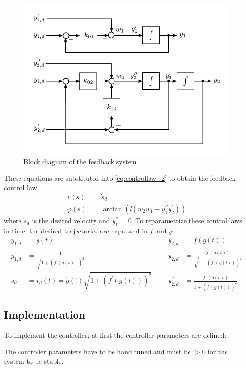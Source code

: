 \documentclass[a4paper,11pt,headings=standardclasses,parskip=half]{scrartcl}
\newcommand{\listcode}[3]{}
\newcommand{\listcodefbcontrol}[2]{\listcode{#1}{#2}{../sim/03_car_feedback_control.py}}
\begin{document}
\begin{figure}[ht]
\centering
\includegraphics[scale=1]{img/linear_system_feedback.pdf}
\caption{Block diagram of the feedback system}
\label{fig:linear_system_feedback}
\end{figure}
These equations are substituted into \eqref{eq:controllaw_2} to obtain the feedback control law:
\begin{subequations}
\begin{align}
v(s) &= \dot{s}_d\\
\varphi(s) &= \arctan\left(l (w_2w_1-y_1^{\prime\prime}y_2^\prime)\right)
\end{align}
\end{subequations}
where $\dot{s}_d$ is the desired velocity  and $y_1^{\prime\prime} = 0$.
To reparametrize these control laws in time, the desired trajectories are expressed in $f$ and $g$:
\begin{subequations}
\begin{align*}
y_{1,d} &= g(t)  &&& y_{2,d} &= f(g(t))\\
y_{1,d}^\prime &= \frac{1}{\sqrt{1+(f^{\prime }(g(t)))^2}} &&& y_{2,d}^\prime &= \frac{f^{\prime }(g(t))}{\sqrt{1+(f^{\prime }(g(t)))^2}}\\
\dot{s}_d &= v_d(t) = \dot g(t) \sqrt{1 + (f^\prime(g(t)))^2}&&& y_{2,d}^{\prime\prime} &= \frac{f^{\prime \prime}(g(t))}{1+(f^{\prime }(g(t)))^2}
\end{align*}
\end{subequations}
\subsection{Implementation}
To implement the controller, at first the controller parameters are defined:
\listcodefbcontrol{91}{94}
The controller parameters have to be hand tuned and must be $>0$ for the system to be stable.
\end{document}
